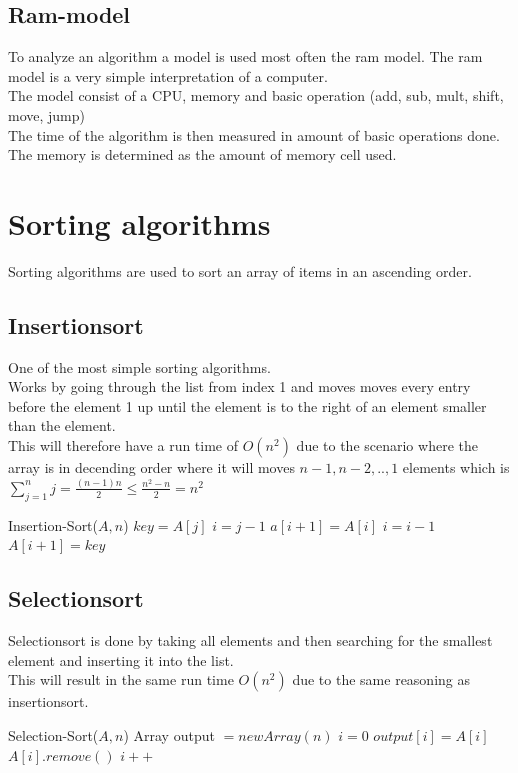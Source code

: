 \documentclass[12pt, a4paper]{article}
\begin{document}
			\subsection{Ram-model}
				To analyze an algorithm a model is used most often the ram model.
				The ram model is a very simple interpretation of a computer.\\
				The model consist of a CPU, memory and basic operation (add, sub, mult, shift, move, jump)\\
				The time of the algorithm is then measured in amount of basic operations done.\\
				The memory is determined as the amount of memory cell used.
		\section{Sorting algorithms}
			Sorting algorithms are used to sort an array of items in an ascending order.\\
			\subsection{Insertionsort}
				One of the most simple sorting algorithms.\\
				Works by going through the list from index 1 and moves moves every entry before the element 1 up until the element is to the right of an element smaller than the element.\\
				This will therefore have a run time of $O(n^2)$ due to the scenario where the array is in decending order where it will moves $n-1,n-2,..,1$ elements which is $\sum\limits_{j=1}^nj=\frac{(n-1)n}{2}\leq\frac{n^2-n}{2}=n^2$
				\begin{algorithmic}[1]
					\State Insertion-Sort($A,n$)
						\State $key = A[j]$
						\State $i=j-1$
							\State $a[i+1]=A[i]$
							\State $i = i-1$
						\EndWhile
						\State $A[i+1]=key$
					\EndFor
				\end{algorithmic}
			\subsection{Selectionsort}
				Selectionsort is done by taking all elements and then searching for the smallest element and inserting it into the list.\\
				This will result in the same run time $O(n^2)$ due to the same reasoning as insertionsort.\\
				\begin{algorithmic}[1]
					\State Selection-Sort($A,n$)
					\State Array output $= new Array(n)$
					\State $i = 0$
						\State $output[i] = A[i]$
						\State $A[i].remove()$
						\State $i++$
					\EndWhile
				\end{algorithmic}
\end{document}
